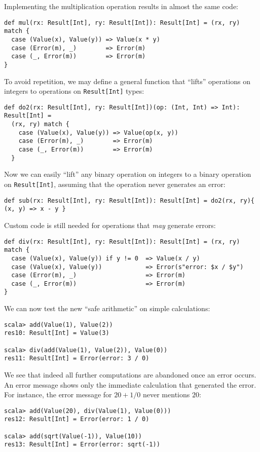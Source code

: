 Implementing the multiplication operation results in almost the same
code:
\begin{lstlisting}
def mul(rx: Result[Int], ry: Result[Int]): Result[Int] = (rx, ry) match {
  case (Value(x), Value(y)) => Value(x * y)
  case (Error(m), _)        => Error(m)
  case (_, Error(m))        => Error(m)
}
\end{lstlisting}
To avoid repetition, we may define a general function that ``lifts''
operations on integers to operations on \lstinline!Result[Int]! types:
\begin{lstlisting}
def do2(rx: Result[Int], ry: Result[Int])(op: (Int, Int) => Int): Result[Int] =
  (rx, ry) match {
    case (Value(x), Value(y)) => Value(op(x, y))
    case (Error(m), _)        => Error(m)
    case (_, Error(m))        => Error(m)
  }
\end{lstlisting}
Now we can easily ``lift'' any binary operation on integers to a
binary operation on \lstinline!Result[Int]!, assuming that the operation
never generates an error:
\begin{lstlisting}
def sub(rx: Result[Int], ry: Result[Int]): Result[Int] = do2(rx, ry){ (x, y) => x - y }
\end{lstlisting}
 Custom code is still needed for operations that \emph{may} generate
errors:
\begin{lstlisting}
def div(rx: Result[Int], ry: Result[Int]): Result[Int] = (rx, ry) match {
  case (Value(x), Value(y)) if y != 0  => Value(x / y)
  case (Value(x), Value(y))            => Error(s"error: $x / $y")
  case (Error(m), _)                   => Error(m)
  case (_, Error(m))                   => Error(m)
}
\end{lstlisting}
We can now test the new ``safe arithmetic'' on simple calculations:
\begin{lstlisting}
scala> add(Value(1), Value(2))
res10: Result[Int] = Value(3)

scala> div(add(Value(1), Value(2)), Value(0))
res11: Result[Int] = Error(error: 3 / 0)
\end{lstlisting}
We see that indeed all further computations are abandoned once an
error occurs. An error message shows only the immediate calculation
that generated the error. For instance, the error message for $20+1/0$
never mentions $20$:
\begin{lstlisting}
scala> add(Value(20), div(Value(1), Value(0)))
res12: Result[Int] = Error(error: 1 / 0)

scala> add(sqrt(Value(-1)), Value(10))
res13: Result[Int] = Error(error: sqrt(-1))
\end{lstlisting}


